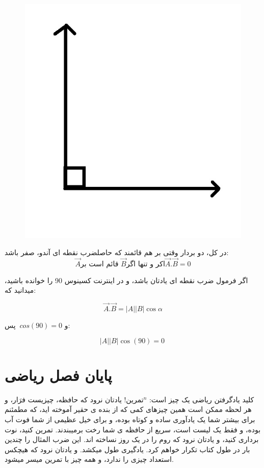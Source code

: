 \documentclass[14pt,a4paper]{memoir}
\begin{document}
	 \begin{figure}[H]
	 	\centering
	 		\includegraphics[scale=0.3]{Orthogonal}
	 \end{figure}

	 در کل، دو بردار وقتی بر هم قائمند که حاصلضرب نقطه ای آندو، صفر باشد:
	 \[ \vec{A} \text{قائم است بر } \vec{B} \text{اکر و تنها اگر} \vec{A}.\vec{B} = 0 \]  
	 
	 اگر فرمول ضرب نقطه ای یادتان باشد، و در اینترنت کسینوس 90 را خوانده باشید، میدانید که:
	 
	 
	 
	 \[ \vec{A}.\vec{B} = |A||B|\cos \alpha \]
	 
	 و $ \ cos(90)  = 0$
	 پس:
	 
	 \[ |A||B|\cos (90) = 0 \ \]
	 
	 
\section{پایان فصل ریاضی}\label{mathend}

کلید یادگرفتن ریاضی یک چیز است: $  \text{تمرین}^n  $! یادتان نرود که حافظه، چیزیست فرَار، و هر لحظه ممکن است همین چیزهای کمی که از بنده ی حقیر آموخته اید، که مطمئنم برای بیشتر شما یک یادآوری ساده و کوتاه بوده، و برای خیل عظیمی از شما فوت آب بوده، و فقط یک لیست است، سریع از حافظه ی شما رخت برمیبندند. تمرین کنید، نوت برداری کنید، و یادتان نرود که روم را در یک روز نساخته اند. این ضرب المثال را چندین بار در طول کتاب تکرار خواهم کرد. یادگیری طول میکشد. و یادتان نرود که هیچکس استعداد چیزی را ندارد، و همه چیز با تمرین میسر میشود.
\end{document}
